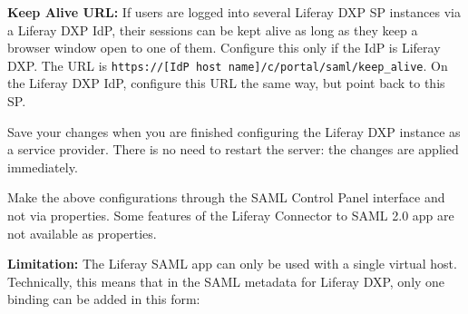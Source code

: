 \textbf{Keep Alive URL:} If users are logged into several Liferay DXP SP
instances via a Liferay DXP IdP, their sessions can be kept alive as
long as they keep a browser window open to one of them. Configure this
only if the IdP is Liferay DXP. The URL is
\texttt{https://{[}IdP\ host\ name{]}/c/portal/saml/keep\_alive}. On the
Liferay DXP IdP, configure this URL the same way, but point back to this
SP.

Save your changes when you are finished configuring the Liferay DXP
instance as a service provider. There is no need to restart the server:
the changes are applied immediately.

Make the above configurations through the SAML Control Panel interface
and not via properties. Some features of the Liferay Connector to SAML
2.0 app are not available as properties.

\noindent\hrulefill

\textbf{Limitation:} The Liferay SAML app can only be used with a single
virtual host. Technically, this means that in the SAML metadata for
Liferay DXP, only one binding can be added in this form:

